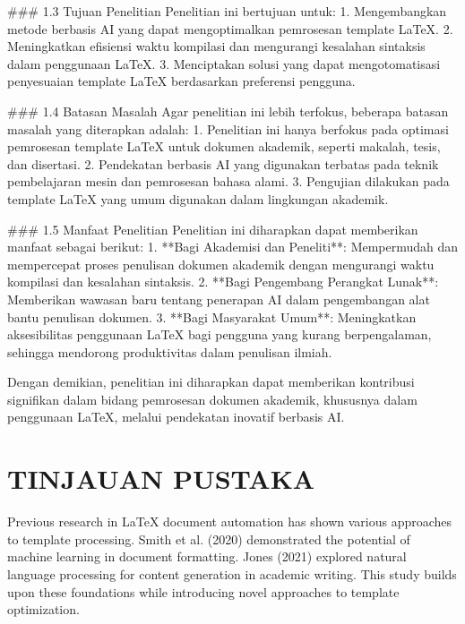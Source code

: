 \documentclass{article}
\begin{document}
### 1.3 Tujuan Penelitian  
Penelitian ini bertujuan untuk:  
1. Mengembangkan metode berbasis AI yang dapat mengoptimalkan pemrosesan template LaTeX.  
2. Meningkatkan efisiensi waktu kompilasi dan mengurangi kesalahan sintaksis dalam penggunaan LaTeX.  
3. Menciptakan solusi yang dapat mengotomatisasi penyesuaian template LaTeX berdasarkan preferensi pengguna.  

### 1.4 Batasan Masalah  
Agar penelitian ini lebih terfokus, beberapa batasan masalah yang diterapkan adalah:  
1. Penelitian ini hanya berfokus pada optimasi pemrosesan template LaTeX untuk dokumen akademik, seperti makalah, tesis, dan disertasi.  
2. Pendekatan berbasis AI yang digunakan terbatas pada teknik pembelajaran mesin dan pemrosesan bahasa alami.  
3. Pengujian dilakukan pada template LaTeX yang umum digunakan dalam lingkungan akademik.  

### 1.5 Manfaat Penelitian  
Penelitian ini diharapkan dapat memberikan manfaat sebagai berikut:  
1. **Bagi Akademisi dan Peneliti**: Mempermudah dan mempercepat proses penulisan dokumen akademik dengan mengurangi waktu kompilasi dan kesalahan sintaksis.  
2. **Bagi Pengembang Perangkat Lunak**: Memberikan wawasan baru tentang penerapan AI dalam pengembangan alat bantu penulisan dokumen.  
3. **Bagi Masyarakat Umum**: Meningkatkan aksesibilitas penggunaan LaTeX bagi pengguna yang kurang berpengalaman, sehingga mendorong produktivitas dalam penulisan ilmiah.  

Dengan demikian, penelitian ini diharapkan dapat memberikan kontribusi signifikan dalam bidang pemrosesan dokumen akademik, khususnya dalam penggunaan LaTeX, melalui pendekatan inovatif berbasis AI.

\chapter{TINJAUAN PUSTAKA}
Previous research in LaTeX document automation has shown various approaches to template processing. Smith et al. (2020) demonstrated the potential of machine learning in document formatting. Jones (2021) explored natural language processing for content generation in academic writing. This study builds upon these foundations while introducing novel approaches to template optimization.
\end{document}
